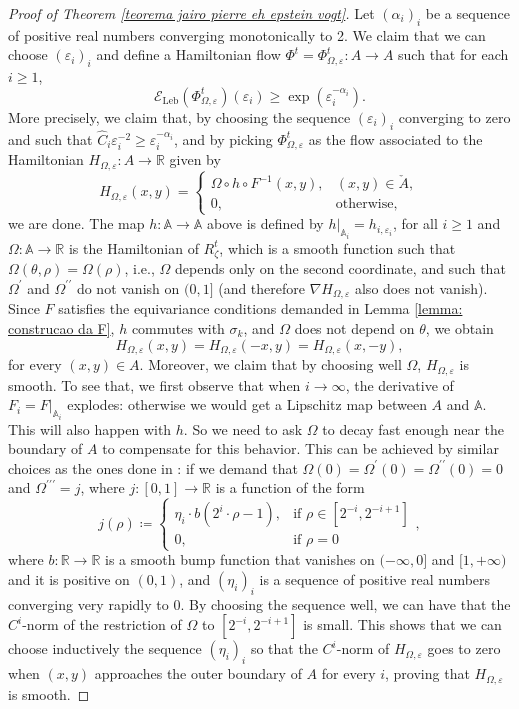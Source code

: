 \documentclass[11pt,reqno]{amsart}
\theoremstyle{plain}
\theoremstyle{definition}
\theoremstyle{remark}
\theoremstyle{plain}
\numberwithin{equation}{section}
\newcommand{\R}{\mathbb{R}}
\newcommand{\A}{\mathbb{A}}
\newcommand{\restr}[2]{#1|_{#2}}
\newcommand{\eps}{\varepsilon}
\begin{document}
	
	\begin{proof}[Proof of Theorem \ref{teorema jairo pierre eh epstein vogt}]
		Let $(\alpha_{i})_{i}$ be a sequence of positive real numbers converging monotonically to 2. We claim that we can choose $(\eps_{i})_{i}$ and define a Hamiltonian flow $\Phi^{t}=\Phi^{t}_{\Omega,\eps}\colon A\to A$ such that for each $i\geq 1$,  $$\mathcal{E}_{\mathrm{Leb}}(\Phi^{t}_{\Omega,\eps})(\eps_{i})\geq \exp(\eps_{i}^{-\alpha_{i}}).$$ More precisely, we claim that, by choosing the sequence $(\eps_{i})_{i}$ converging to zero and such that $\widehat{C}_{i}\eps_{i}^{-2}\geq \eps_{i}^{-\alpha_{i}}$, and by picking $\Phi^{t}_{\Omega,\eps}$ as the flow associated to the Hamiltonian $H_{\Omega, \eps}\colon A \to \R$ given by 
		\[
		H_{\Omega,\varepsilon}(x,y)=
		\begin{cases}
			\Omega\circ h \circ F^{-1}(x,y),& (x,y)\in\check{A},\\[4pt]
			0,&\text{otherwise},
		\end{cases}
		\] we are done. The map $h\colon \A\to \A$ above is defined by $\restr{h}{\A_{i}}=h_{i,\eps_{i}}$, for all $i\geq 1$
		and $\Omega\colon \A\to \R$ is the Hamiltonian of $R_{\zeta}^{t}$, which is a smooth function such that $\Omega(\theta,\rho)=\Omega(\rho)$, i.e., $\Omega$ depends only on the second coordinate, and such that $\Omega^{\prime}$ and $\Omega^{\prime\prime}$ do not vanish on $(0,1]$ (and therefore $\nabla H_{\Omega,\eps}$ also does not vanish). Since $F$ satisfies the equivariance conditions demanded in Lemma \ref{lemma: construcao da F}, $h$ commutes with $\sigma_{k}$, and $\Omega$ does not depend on $\theta$, we obtain $$H_{\Omega,\eps}(x,y)=H_{\Omega,\eps}(-x,y)=H_{\Omega,\eps}(x,-y),$$ for every $(x,y)\in A$. Moreover, we claim that by choosing well $\Omega$, $H_{\Omega,\eps}$ is smooth. To see that, we first observe that when $i\to \infty$, the derivative of $F_{i}=\restr{F}{\A_{i}}$ explodes: otherwise we would get a Lipschitz map between $A$ and $\A$. This will also happen with $h$. So we need to ask $\Omega$ to decay fast enough near the boundary of $A$ to compensate for this behavior. This can be achieved by similar choices as the ones done in \cite{bergerbochi}: if we demand that $\Omega(0)=\Omega^{\prime}(0)=\Omega^{\prime\prime}(0)=0$ and $\Omega^{\prime\prime\prime}=j$, where $j\colon [0,1]\to \R$ is a function of the form $$j(\rho)\coloneqq \begin{cases}
			\eta_{i}\cdot b(2^{i}\cdot \rho -1) , & \text{if } \rho\in [2^{-i},2^{-i+1}] \\
			0, & \text{if }\rho=0
		\end{cases}, $$
		 where $b\colon \R\to \R$ is a smooth bump function that vanishes on $(-\infty,0]$ and $[1,+\infty)$ and it is positive on $(0,1)$, and $(\eta_{i})_{i}$ is a sequence of positive real numbers converging very rapidly to 0. By choosing the sequence well, we can have that the $C^{i}$-norm of the restriction of $\Omega$ to $[2^{-i},2^{-i+1}]$ is small. This shows that we can choose inductively the sequence $(\eta_{i})_{i}$ so that the $C^{i}$-norm of $H_{\Omega, \eps}$ goes to zero when $(x,y)$ approaches the outer boundary of $A$ for every $i$, proving that $H_{\Omega,\eps}$ is smooth.
		

\end{proof}
\end{document}
